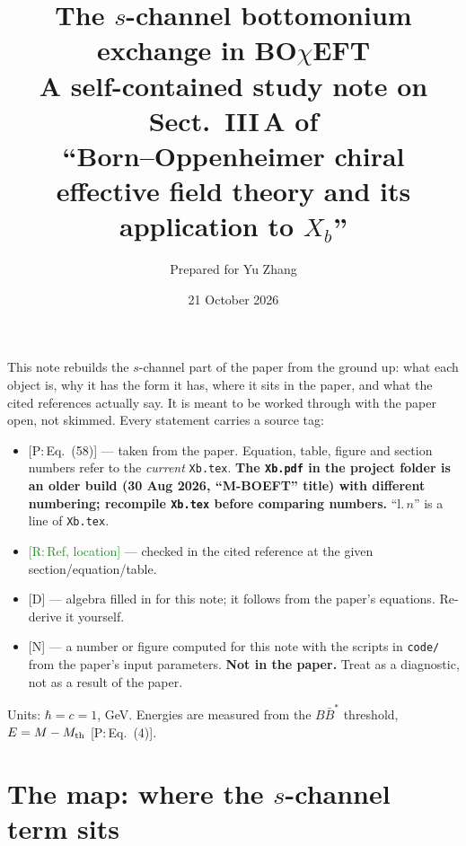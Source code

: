 \documentclass[11pt,a4paper]{article}
\title{\textbf{The $s$-channel bottomonium exchange in BO$\chi$EFT}\\[3pt]
\large A self-contained study note on Sect.~III\,A of\\
``Born--Oppenheimer chiral effective field theory and its application to $X_b$''}
\author{Prepared for Yu Zhang}
\date{21 October 2026}
\newcommand{\tagP}[1]{\textcolor{blue!65!black}{\textsf{\small[P:\,#1]}}}
\newcommand{\tagR}[1]{\textcolor{ForestGreen}{\textsf{\small[R:\,#1]}}}
\newcommand{\tagD}{\textcolor{orange!85!black}{\textsf{\small[D]}}}
\newcommand{\tagN}{\textcolor{red!70!black}{\textsf{\small[N]}}}
\newcommand{\BBst}{B\bar B^*}
\newcommand{\Mth}{M_{\rm th}}
\begin{document}
\maketitle

\begin{keybox}
This note rebuilds the $s$-channel part of the paper from the ground up: what each object is, why it has the form it has, where it sits in the paper, and what the cited references actually say. It is meant to be worked through with the paper open, not skimmed. Every statement carries a source tag:
\begin{itemize}
\item \tagP{Eq.~(58)} --- taken from the paper. Equation, table, figure and section numbers refer to the \emph{current} \texttt{Xb.tex}. \textbf{The \texttt{Xb.pdf} in the project folder is an older build (30 Aug 2026, ``M-BOEFT'' title) with different numbering; recompile \texttt{Xb.tex} before comparing numbers.} ``l.\,$n$'' is a line of \texttt{Xb.tex}.
\item \tagR{Ref, location} --- checked in the cited reference at the given section/equation/table.
\item \tagD{} --- algebra filled in for this note; it follows from the paper's equations. Re-derive it yourself.
\item \tagN{} --- a number or figure computed for this note with the scripts in \texttt{code/} from the paper's input parameters. \textbf{Not in the paper.} Treat as a diagnostic, not as a result of the paper.
\end{itemize}
Units: $\hbar=c=1$, GeV. Energies are measured from the $\BBst$ threshold, $E=M-\Mth$ \tagP{Eq.~(4)}.
\end{keybox}

\tableofcontents
\newpage

\section{The map: where the $s$-channel term sits}
\end{document}
